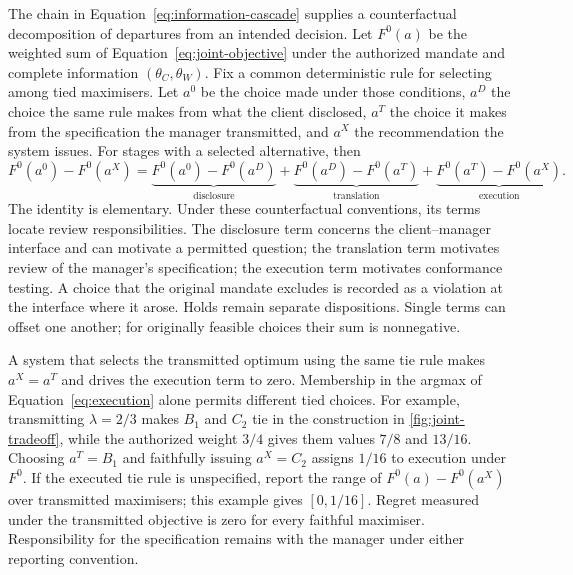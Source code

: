 \documentclass[oneside,10pt,english]{swissi}
\begin{document}
The chain in Equation~\eqref{eq:information-cascade} supplies a counterfactual decomposition of departures from an intended decision. Let $F^0(a)$ be the weighted sum of Equation~\eqref{eq:joint-objective} under the authorized mandate and complete information $(\theta_C,\theta_W)$. Fix a common deterministic rule for selecting among tied maximisers. Let $a^0$ be the choice made under those conditions, $a^D$ the choice the same rule makes from what the client disclosed, $a^T$ the choice it makes from the specification the manager transmitted, and $a^X$ the recommendation the system issues. For stages with a selected alternative, then
\begin{equation}
 F^0(a^0)-F^0(a^X)=
 \underbrace{F^0(a^0)-F^0(a^D)}_{\text{disclosure}}
 +\underbrace{F^0(a^D)-F^0(a^T)}_{\text{translation}}
 +\underbrace{F^0(a^T)-F^0(a^X)}_{\text{execution}}.
 \label{eq:interface-losses}
\end{equation}
The identity is elementary. Under these counterfactual conventions, its terms locate review responsibilities. The disclosure term concerns the client--manager interface and can motivate a permitted question; the translation term motivates review of the manager's specification; the execution term motivates conformance testing. A choice that the original mandate excludes is recorded as a violation at the interface where it arose. Holds remain separate dispositions. Single terms can offset one another; for originally feasible choices their sum is nonnegative.

A system that selects the transmitted optimum using the same tie rule makes $a^X=a^T$ and drives the execution term to zero. Membership in the argmax of Equation~\eqref{eq:execution} alone permits different tied choices. For example, transmitting $\lambda=2/3$ makes $B_1$ and $C_2$ tie in the construction in \cref{fig:joint-tradeoff}, while the authorized weight $3/4$ gives them values $7/8$ and $13/16$. Choosing $a^T=B_1$ and faithfully issuing $a^X=C_2$ assigns $1/16$ to execution under $F^0$. If the executed tie rule is unspecified, report the range of $F^0(a)-F^0(a^X)$ over transmitted maximisers; this example gives $[0,1/16]$. Regret measured under the transmitted objective is zero for every faithful maximiser. Responsibility for the specification remains with the manager under either reporting convention.
\end{document}
